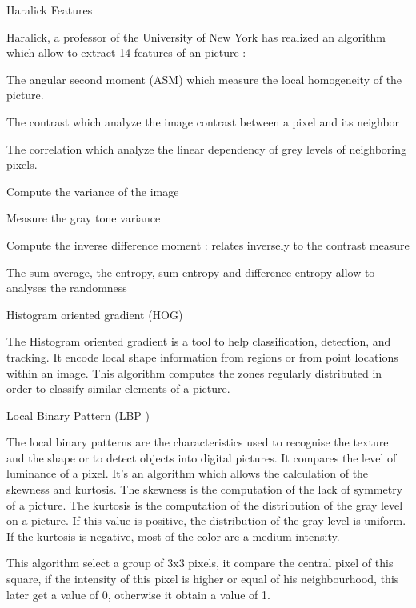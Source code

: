 
Haralick Features

Haralick, a professor of the University of New York has realized an algorithm which allow to extract 14 features of an picture :

    The angular second moment (ASM) which measure the local homogeneity of the picture.

    The contrast which analyze the image contrast between a pixel and its neighbor

    The correlation which analyze the linear dependency of grey levels of neighboring pixels.

    Compute the variance of the image

    Measure the gray tone variance

    Compute the inverse difference moment : relates inversely to the contrast measure

    The sum average, the entropy, sum entropy and difference entropy allow to analyses the randomness

Histogram oriented gradient (HOG)

The Histogram oriented gradient is a tool to help classification, detection, and tracking. It encode local shape information from regions or from point locations within an image. This algorithm computes the zones regularly distributed in order to classify similar elements of a picture.

Local Binary Pattern (LBP )

The local binary patterns are the characteristics used to recognise the texture and the shape or to detect objects into digital pictures. It compares the level of luminance of a pixel. It’s an algorithm which allows the calculation of the skewness and kurtosis. The skewness is the computation of the lack of symmetry of a picture. The kurtosis is the computation of the distribution of the gray level on a picture. If this value is positive, the distribution of the gray level is uniform. If the kurtosis is negative, most of the color are a medium intensity.

This algorithm select a group of 3x3 pixels, it compare the central pixel of this square, if the intensity of this pixel is higher or equal of his neighbourhood, this later get a value of 0, otherwise it obtain a value of 1.
  
  